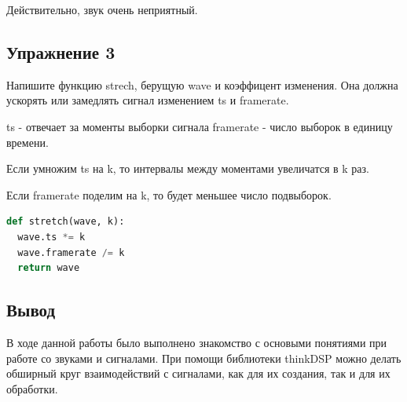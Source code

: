 Действительно, звук очень неприятный.


\subsection{Упражнение 3}

Напишите функцию strech, берущую wave и коэффицент изменения. Она должна ускорять или замедлять сигнал изменением ts и framerate.

\noindent ts - отвечает за моменты выборки сигнала framerate - число выборок в единицу времени.

\noindent Если умножим ts на k, то интервалы между моментами увеличатся в k раз.

\noindent Если framerate поделим на k, то будет меньшее число подвыборок.

\begin{lstlisting}[language=Python]
def stretch(wave, k):
  wave.ts *= k
  wave.framerate /= k
  return wave 
\end{lstlisting}


\subsection{Вывод}
В ходе данной работы было выполнено знакомство с основыми понятиями при работе со звуками и сигналами. При помощи библиотеки thinkDSP можно делать обширный круг взаимодействий с сигналами, как для их создания, так и для их обработки.